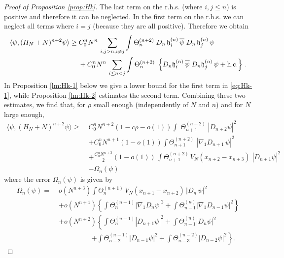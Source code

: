 \documentclass[11pt]{article}
\newcommand{\fh}{{\frak h}}
\begin{document}
\begin{proof}[Proof of Proposition \ref{prop:Hk}]
The last term on the r.h.s. (where $i,j \leq n$) is positive and
therefore it can be neglected. In the first term on the r.h.s. we
can neglect all terms where $i=j$ (because they are all positive).
Therefore we obtain
\begin{equation}\label{eq:Hk-1}
\begin{split}
\langle \psi, (H_N+N)^{n+2} \psi \rangle \geq \; & C_0^n N^n \,
\sum_{i,j > n, i\neq j} \int \Theta^{(n+2)}_n \; D_n \, \fh^{(n)}_i
\, \overline{\psi} \; D_n \, \fh^{(n)}_j \, \psi \\ &+ C_0^n N^n \,
\sum_{i\leq n < j} \int \Theta^{(n+2)}_n \; \left\{ D_n \fh^{(n)}_i
\, \overline{\psi} \; D_n \fh^{(n)}_j \, \psi + \text{h.c.} \right\}
\,.
\end{split}
\end{equation}
In Proposition \ref{lm:Hk-1} below we give a lower bound for the
first term in \eqref{eq:Hk-1}, while Proposition \ref{lm:Hk-2}
estimates the second term. Combining these two estimates, we find
that,  for $\rho$ small enough (independently of $N$ and $n$)
and for $N$ large enough,
\begin{equation}\label{eq:negg}
\begin{split}
\langle \psi, (H_N+N)^{n+2} \psi \rangle \geq \; &C_0^n N^{n+2} (1-
c\rho-o(1)) \int \; \Theta^{(n+2)}_{n+1} \; |D_{n+2} \psi|^2
\\ &+ C_0^n N^{n+1} (1-o(1)) \int
\Theta^{(n+2)}_{n+1} \; |\nabla_1 D_{n+1} \,\psi|^2  \\ &+
\frac{C_0^n N^{n+3}}{2} (1-o(1)) \, \int \Theta^{(n+2)}_{n+1} \,
V_N (x_{n+2} -x_{n+3}) \; |D_{n+1} \psi|^2  \\
&-\Omega_n (\psi) \end{split}
\end{equation}
where the error $\Omega_n (\psi)$ is given by
\begin{equation}\label{eq:error}
\begin{split}
\Omega_n (\psi) = \; &o(N^{n+3}) \int \Theta^{(n+1)}_{n} \, V_N
(x_{n+1} -x_{n+2})\, |D_n \, \psi|^2 \\ &+ o(N^{n+1}) \left\{ \int
\Theta^{(n+1)}_{n} |\nabla_1 D_n \psi|^2 + \int \Theta^{(n)}_{n-1}
|\nabla_1 D_{n-1} \psi|^2 \right\}
\\ &+ o(N^{n+2}) \left\{  \int \Theta^{(n+1)}_{n}
|D_{n+1} \psi|^2 + \int \Theta^{(n)}_{n-1} |D_n \psi|^2
\right. \\
&\hspace{2cm} \left. + \int \Theta^{(n-1)}_{n-2} |D_{n-1} \psi|^2
+\int \Theta^{(n-2)}_{n-3} |D_{n-2} \psi|^2\right\}.

\end{split}
\end{equation}
\end{proof}
\end{document}
